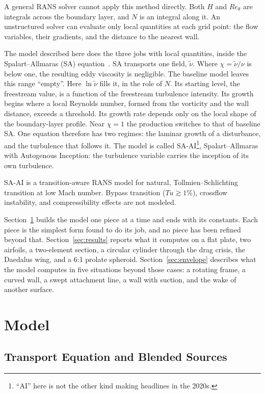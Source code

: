 \documentclass[conf]{new-aiaa}
\begin{document}
A general RANS solver cannot apply this method directly. Both $H$ and $Re_\theta$ are integrals across the boundary layer, and $N$ is an integral along it. An unstructured solver can evaluate only
local quantities at each grid point: the flow variables, their gradients, and
the distance to the nearest wall.

The model described here does the three jobs with local quantities, inside
the Spalart--Allmaras (SA) equation~\cite{spalart_allmaras_1992}. SA
transports one field, $\tilde\nu$. Where $\chi=\tilde\nu/\nu$ is below one,
the resulting eddy viscosity is negligible. The baseline model leaves this
range ``empty''. Here $\ln\tilde\nu$ fills it, in the role of $N$. Its starting level, the
freestream value, is a function of the freestream turbulence intensity. Its growth
begins where a local Reynolds number, formed from the vorticity and the wall
distance, exceeds a threshold. Its growth rate depends only on the local shape of
the boundary-layer profile. Near $\chi=1$ the production switches to that of baseline SA. One
equation therefore has two regimes: the laminar growth of a disturbance, and
the turbulence that follows it. The model is called SA-AI\footnote{``AI'' here is not the other kind making headlines in the 2020s.}, Spalart--Allmaras with
Autogenous Inception: the turbulence variable carries the inception of its
own turbulence.

SA-AI is a transition-aware RANS model for natural, Tollmien--Schlichting transition at low Mach number.
Bypass transition ($Tu\gtrsim1\%$), crossflow instability, and
compressibility effects are not modeled.

Section~\ref{sec:model} builds the model one piece at a time and ends with
its constants. Each piece is the simplest form found to do its job, and no
piece has been refined beyond that. Section~\ref{sec:results} reports what it computes on a flat
plate, two airfoils, a two-element section, a circular cylinder through the
drag crisis, the Daedalus wing, and a 6:1 prolate spheroid.
Section~\ref{sec:envelope} describes what the model computes in five
situations beyond those cases: a rotating frame, a curved wall, a swept
attachment line, a wall with suction, and the wake of another surface.


\section{Model}\label{sec:model}

\subsection{Transport Equation and Blended Sources}
\end{document}
